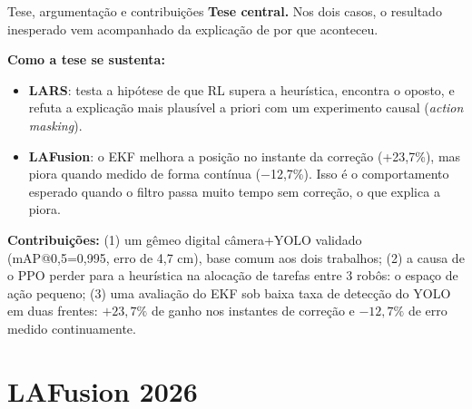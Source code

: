 \documentclass[aspectratio=169]{beamer}
\begin{document}
\begin{frame}{Tese, argumentação e contribuições}
\small
\textbf{Tese central.} Nos dois casos, o resultado inesperado vem acompanhado da explicação de por que aconteceu.

\vspace{0.2cm}
\textbf{Como a tese se sustenta:}
\begin{itemize}
\item \textbf{LARS}: testa a hipótese de que RL supera a heurística, encontra o oposto, e refuta a explicação mais plausível a priori com um experimento causal (\emph{action masking}).
\item \textbf{LAFusion}: o EKF melhora a posição no instante da correção (+23,7\%), mas piora quando medido de forma contínua ($-$12,7\%). Isso é o comportamento esperado quando o filtro passa muito tempo sem correção, o que explica a piora.
\end{itemize}

\vspace{0.2cm}
\textbf{Contribuições:} (1) um gêmeo digital câmera+YOLO validado (mAP@0,5=0,995, erro de 4,7 cm), base comum aos dois trabalhos; (2) a causa de o PPO perder para a heurística na alocação de tarefas entre 3 robôs: o espaço de ação pequeno; (3) uma avaliação do EKF sob baixa taxa de detecção do YOLO em duas frentes: $+23,7\%$ de ganho nos instantes de correção e $-12,7\%$ de erro medido continuamente.
\end{frame}

\section{LAFusion 2026}
\end{document}
